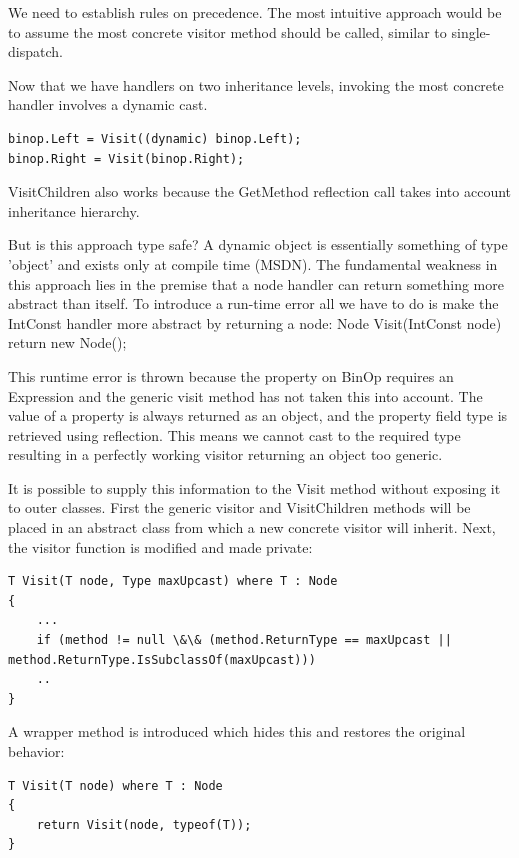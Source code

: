 \documentclass[twoside,openright]{uva-bachelor-thesis}
\begin{document}
			We need to establish rules on precedence. The most intuitive approach would be to assume the most concrete visitor method should be called, similar to single-dispatch.
			
			Now that we have handlers on two inheritance levels, invoking the most concrete handler involves a dynamic cast.
			\begin{lstlisting}[caption=Spanning tree broadcast algorithm.]
binop.Left = Visit((dynamic) binop.Left);
binop.Right = Visit(binop.Right);
			\end{lstlisting}
			
			VisitChildren also works because the GetMethod reflection call takes into account inheritance hierarchy.
			
			But is this approach type safe? A dynamic object is essentially something of type 'object' and exists only at compile time (MSDN). The fundamental weakness in this approach lies in the premise that a node handler can return something more abstract than itself. To introduce a run-time error all we have to do is make the IntConst handler more abstract by returning a node:
			Node Visit(IntConst node) { return new Node(); }
			
			This runtime error is thrown because the property on BinOp requires an Expression and the generic visit method has not taken this into account. The value of a property is always returned as an object, and the property field type is retrieved using reflection. This means we cannot cast to the required type resulting in a perfectly working visitor returning an object too generic.
			
			It is possible to supply this information to the Visit method without exposing it to outer classes. First the generic visitor and VisitChildren methods will be placed in an abstract class from which a new concrete visitor will inherit. Next, the visitor function is modified and made private:
			\begin{lstlisting}[caption=Spanning tree broadcast algorithm.]
T Visit(T node, Type maxUpcast) where T : Node
{
	...
	if (method != null \&\& (method.ReturnType == maxUpcast || method.ReturnType.IsSubclassOf(maxUpcast)))
	..
}
			\end{lstlisting}
			
			A wrapper method is introduced which hides this and restores the original behavior:
			\begin{lstlisting}[caption=Spanning tree broadcast algorithm.]
T Visit(T node) where T : Node
{
	return Visit(node, typeof(T));
}
			\end{lstlisting}
			
\end{document}

